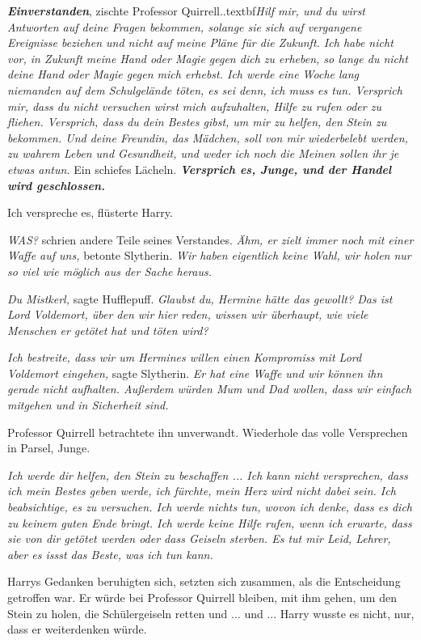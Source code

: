 \glqq{}\textbf{\emph{Einverstanden}}\grqq{}, zischte Professor
Quirrell.\grqq{}.textbf{\emph{Hilf mir, und du wirst Antworten auf deine Fragen
bekommen, solange sie sich auf vergangene Ereignisse beziehen und nicht auf
meine Pläne für die Zukunft. Ich habe nicht vor, in Zukunft meine Hand oder
Magie gegen dich zu erheben, so lange du nicht deine Hand oder Magie gegen mich
erhebst. Ich werde eine Woche lang niemanden auf dem Schulgelände töten, es sei
denn, ich muss es tun. Versprich mir, dass du nicht versuchen wirst mich
aufzuhalten, Hilfe zu rufen oder zu fliehen. Versprich, dass du dein Bestes
gibst, um mir zu helfen, den Stein zu bekommen. Und deine Freundin, das Mädchen,
soll von mir wiederbelebt werden, zu wahrem Leben und Gesundheit, und weder ich
noch die Meinen sollen ihr je etwas antun.}}\grqq{} Ein schiefes Lächeln. \glqq{}
\textbf{\emph{Versprich es, Junge, und der Handel wird geschlossen.}}\grqq{}

\glqq{}Ich verspreche es\grqq{}, flüsterte Harry.

\emph{WAS?} schrien andere Teile seines Verstandes. \emph{Ähm, er zielt immer
noch mit einer Waffe auf uns,} betonte Slytherin. \emph{Wir haben eigentlich
keine Wahl, wir holen nur so viel wie möglich aus der Sache heraus.}

\emph{Du Mistkerl,} sagte Hufflepuff. \emph{Glaubst du, Hermine hätte das
gewollt? Das ist Lord Voldemort, über den wir hier reden, wissen wir überhaupt,
wie viele Menschen er getötet hat und töten wird?}

\emph{Ich bestreite, dass wir um Hermines willen einen Kompromiss mit Lord
Voldemort eingehen,} sagte Slytherin. \emph{Er hat eine Waffe und wir können ihn
gerade nicht} \emph{aufhalten. Außerdem würden Mum und Dad wollen, dass wir
einfach mitgehen und in Sicherheit sind.}

Professor Quirrell betrachtete ihn unverwandt. \glqq{}Wiederhole das volle
Versprechen in Parsel, Junge.\grqq{}

\glqq{}\emph{Ich werde dir helfen, den Stein zu beschaffen ... Ich kann nicht
versprechen, dass ich mein Bestes geben werde, ich fürchte, mein Herz wird nicht
dabei sein. Ich beabsichtige, es zu versuchen. Ich werde nichts tun, wovon ich
denke, dass es dich zu keinem guten Ende bringt. Ich werde keine Hilfe rufen,
wenn ich erwarte, dass sie von dir getötet werden oder dass Geiseln sterben. Es
tut mir Leid, Lehrer, aber es issst das Beste, was ich tun kann.}\grqq{}

Harrys Gedanken beruhigten sich, setzten sich zusammen, als die Entscheidung
getroffen war. Er würde bei Professor Quirrell bleiben, mit ihm gehen, um den
Stein zu holen, die Schülergeiseln retten und ... und ... Harry wusste es nicht,
nur, dass er weiterdenken würde.


